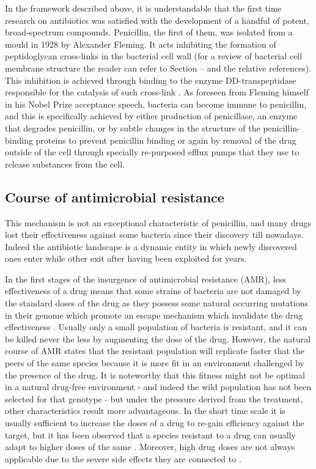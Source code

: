 In the framework described above, it is understandable that the first time research on antibiotics was satisfied with the development of a handful of potent, broad-spectrum compounds.
%
Penicillin, the first of them, was isolated from a mould in 1928 by Alexander Fleming. It acts inhibiting the formation of peptidoglycan cross-links in the bacterial cell wall (for a review of bacterial cell membrane structure the reader can refer to Section -- and the relative references). This inhibition is achieved through binding to the enzyme DD-transpeptidase responsible for the catalysis of such cross-link \cite{McKellar1999???}.
%
As foreseen from Fleming himself in his Nobel Prize acceptance speech, bacteria can become immune to penicillin, and this is specifically achieved by either production of penicillase, an enzyme that degrades penicillin, or by subtle changes in the structure of the penicillin-binding proteins to prevent penicillin binding or again by removal of the drug outside of the cell through specially re-purposed efflux pumps that they use to release substances from the cell.

\subsection{Course of antimicrobial resistance} \label{sec:course_AMR}
This mechanism is not an exceptional characteristic of penicillin, and many drugs lost their effectiveness against some bacteria since their discovery till nowadays. Indeed the antibiotic landscape is a dynamic entity in which newly discovered ones enter while other exit after having been exploited for years.

In the first stages of the insurgence of antimicrobial resistance (AMR), less effectiveness of a drug means that some strains of bacteria are not damaged by the standard doses of the drug as they possess some natural occurring mutations in their genome which promote an escape mechanism which invalidate the drug effectiveness \cite{Kapoor2017,Blair2014}. Usually only a small population of bacteria is resistant, and it can be killed never the less by augmenting the dose of the drug. However, the natural course of AMR states that the resistant population will replicate faster that the peers of the same species because it is more fit in an environment challenged by the presence of the drug. It is noteworthy that this fitness might not be optimal in a natural drug-free environment - and indeed the wild population has not been selected for that genotype - but under the pressure derived from the treatment, other characteristics result more advantageous.
%
In the short time scale it is usually sufficient to increase the doses of a drug to re-gain efficiency against the target, but it has been observed that a species resistant to a drug can usually adapt to higher doses of the same \cite{????}. Moreover, high drug doses are not always applicable due to the severe side effects they are connected to \cite{????}.

